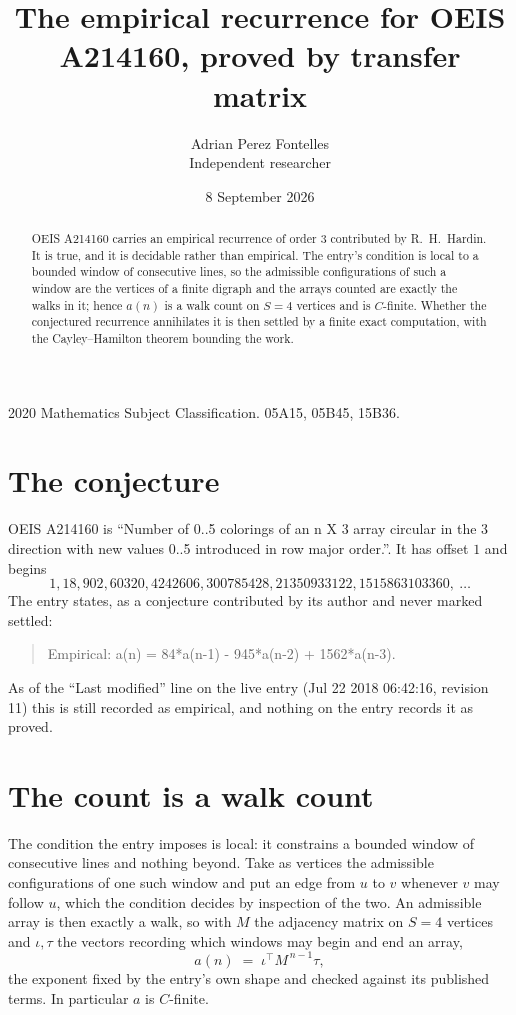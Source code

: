\documentclass[11pt,a4paper]{article}
\title{The empirical recurrence for OEIS A214160, proved by transfer matrix}
\author{Adrian Perez Fontelles\\ \small Independent researcher}
\date{8 September 2026}
\theoremstyle{plain}
\theoremstyle{definition}
\begin{document}
\maketitle

\begin{abstract}
OEIS A214160 carries an empirical recurrence of order $3$ contributed by R.~H.~Hardin. It is
true, and it is decidable rather than empirical. The entry's condition is local to a bounded window of consecutive lines, so
the admissible configurations of such a window are the vertices of a finite digraph and the
arrays counted are exactly the walks in it; hence $a(n)$ is a walk count on $S=4$ vertices
and is $C$-finite. Whether the conjectured recurrence annihilates it is then settled by a
finite exact computation, with the Cayley--Hamilton theorem bounding the work.
\end{abstract}

\noindent\small 2020 Mathematics Subject Classification. 05A15, 05B45, 15B36.\normalsize

\section{The conjecture}

OEIS A214160 is ``Number of 0..5 colorings of an n X 3 array circular in the 3 direction with new values 0..5 introduced in row major order.''. It has offset $1$ and begins
\[
1, 18, 902, 60320, 4242606, 300785428, 21350933122, 1515863103360,\ \dots
\]
The entry states, as a conjecture contributed by its author and never marked settled:
\begin{quote}
Empirical: a(n) = 84*a(n-1) - 945*a(n-2) + 1562*a(n-3).
\end{quote}
As of the ``Last modified'' line on the live entry (Jul 22 2018 06:42:16, revision 11) this is still
recorded as empirical, and nothing on the entry records it as proved.

\section{The count is a walk count}

The condition the entry imposes is local: it constrains a bounded window of consecutive lines and nothing beyond. Take as
vertices the admissible configurations of one such window and put an edge from $u$ to $v$
whenever $v$ may follow $u$, which the condition decides by inspection of the two. An
admissible array is then exactly a walk, so with $M$ the adjacency matrix on $S=4$ vertices
and $\iota,\tau$ the vectors recording which windows may begin and end an array,
\[
a(n)\;=\;\iota^{\!\top}M^{\,n-1}\tau ,
\]
the exponent fixed by the entry's own shape and checked against its published terms. In
particular $a$ is $C$-finite.
\end{document}
